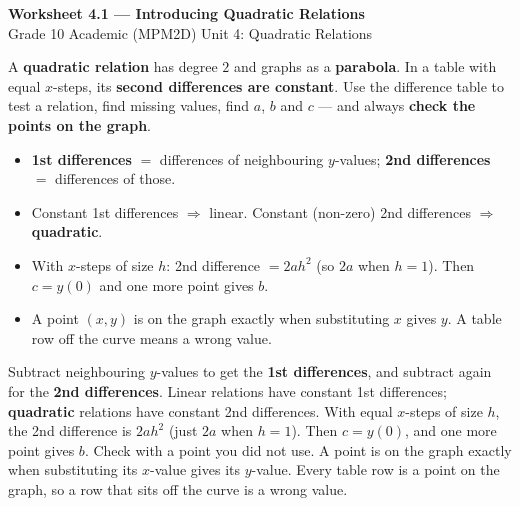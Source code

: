 \documentclass[11pt]{article}
\begin{document}
\begin{center}
{\LARGE\bfseries\color{titleblue}Worksheet 4.1 --- Introducing Quadratic Relations}\\[2pt]
{\small Grade 10 Academic (MPM2D) \textperiodcentered{} Unit 4: Quadratic Relations}
\end{center}

\begin{ideabox}
A \textbf{quadratic relation} has degree $2$ and graphs as a \textbf{parabola}. In a table with equal $x$-steps, its \textbf{second differences are constant}. Use the difference table to test a relation, find missing values, find $a$, $b$ and $c$ --- and always \textbf{check the points on the graph}.
\begin{itemize}[leftmargin=*,itemsep=2pt]
  \item \textcolor{exblue}{\textbf{1st differences}} $=$ differences of neighbouring $y$-values; \textcolor{qorange}{\textbf{2nd differences}} $=$ differences of those.
  \item Constant 1st differences $\Rightarrow$ linear. Constant (non-zero) 2nd differences $\Rightarrow$ \textbf{quadratic}.
  \item With $x$-steps of size $h$: 2nd difference $=2ah^2$ (so $2a$ when $h=1$). Then $c=y(0)$ and one more point gives $b$.
  \item A point $(x,y)$ is on the graph exactly when substituting $x$ gives $y$. A table row off the curve means a wrong value.
\end{itemize}
\end{ideabox}

\begin{learnbox}
Subtract neighbouring $y$-values to get the \textbf{1st differences}, and subtract again for the \textbf{2nd differences}. Linear relations have constant 1st differences; \textbf{quadratic} relations have constant 2nd differences.
With equal $x$-steps of size $h$, the 2nd difference is $2ah^2$ (just $2a$ when $h=1$). Then $c=y(0)$, and one more point gives $b$. Check with a point you did not use.
A point is on the graph exactly when substituting its $x$-value gives its $y$-value. Every table row is a point on the graph, so a row that sits off the curve is a wrong value.
\end{learnbox}

\end{document}
